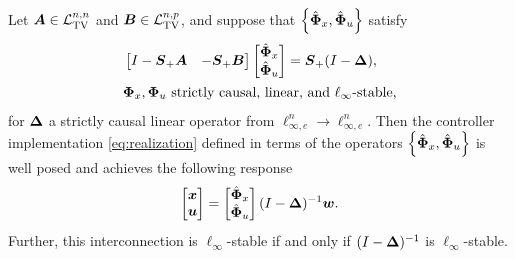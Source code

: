 \begin{theorem}\label{thm:robust-sls}
Let $\boldsymbol{A}\in\mathcal{L}_{\mathrm{TV}}^{n,n}$ and $\boldsymbol{B}\in\mathcal{L}_{\mathrm{TV}}^{n,p}$, and suppose that $\left\{\hat{\boldsymbol{\Phi}}_x,\hat{\boldsymbol{\Phi}}_u\right\}$ satisfy
\begin{equation}
\begin{aligned}
&\begin{bmatrix} I-\boldsymbol{S}_+\boldsymbol{A} & - \boldsymbol{S}_+\boldsymbol{B}\end{bmatrix}\begin{bmatrix} \hat{\boldsymbol{\Phi}}_x \\ \hat{\boldsymbol{\Phi}}_u \end{bmatrix} = \boldsymbol{S}_+(I-{\boldsymbol{\Delta}}), \\ 
& \boldsymbol{\Phi}_x, \boldsymbol{\Phi}_u \text{ strictly causal, linear, and $\ell_\infty$-stable,}
\end{aligned}
\end{equation}
for ${\boldsymbol{\Delta}}$ a strictly causal linear operator from $\ell^n_{\infty,e}\to \ell^n_{\infty,e}$.  Then the controller implementation \eqref{eq:realization} defined in terms of the operators $\left\{\hat{\boldsymbol{\Phi}}_x,\hat{\boldsymbol{\Phi}}_u\right\}$ is well posed and achieves the following response
\begin{equation}
\begin{bmatrix} \boldsymbol{x} \\ \boldsymbol{u} \end{bmatrix} = \begin{bmatrix}\hat{\boldsymbol{\Phi}}_x\\ \hat{\boldsymbol{\Phi}}_u \end{bmatrix}(I-{\boldsymbol{\Delta}})^{-1}\boldsymbol{w}.
\label{eq:robust-response}
\end{equation}
Further, this interconnection is $\ell_\infty$-stable if and only if $(I-{\boldsymbol{\Delta}})^{-1}$ is $\ell_\infty$-stable.
\end{theorem}
